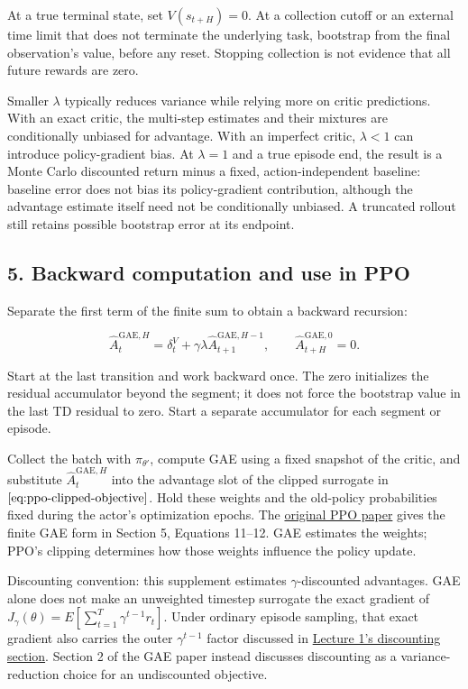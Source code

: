 \documentclass[11pt, a4paper]{article}
\begin{document}
At a true terminal state, set $V(s_{t+H})=0$. At a collection cutoff or an external time limit that does not terminate the underlying task, bootstrap from the final observation's value, before any reset. Stopping collection is not evidence that all future rewards are zero.

Smaller $\lambda$ typically reduces variance while relying more on critic predictions. With an exact critic, the multi-step estimates and their mixtures are conditionally unbiased for advantage. With an imperfect critic, $\lambda<1$ can introduce policy-gradient bias. At $\lambda=1$ and a true episode end, the result is a Monte Carlo discounted return minus a fixed, action-independent baseline: baseline error does not bias its policy-gradient contribution, although the advantage estimate itself need not be conditionally unbiased. A truncated rollout still retains possible bootstrap error at its endpoint.

\subsection*{5. Backward computation and use in PPO}

Separate the first term of the finite sum to obtain a backward recursion:

\begin{equation}\label{eq:ppo-gae-backward-recursion}
    \hat A_t^{\mathrm{GAE},H}
    =\delta_t^V+\gamma\lambda\hat A_{t+1}^{\mathrm{GAE},H-1},
    \qquad \hat A_{t+H}^{\mathrm{GAE},0}=0.
\end{equation}

Start at the last transition and work backward once. The zero initializes the residual accumulator beyond the segment; it does not force the bootstrap value in the last TD residual to zero. Start a separate accumulator for each segment or episode.

Collect the batch with $\pi_{\theta'}$, compute GAE using a fixed snapshot of the critic, and substitute $\hat A_t^{\mathrm{GAE},H}$ into the advantage slot of the clipped surrogate in $\eqref{eq:ppo-clipped-objective}$. Hold these weights and the old-policy probabilities fixed during the actor's optimization epochs. The \href{https://arxiv.org/abs/1707.06347}{original PPO paper} gives the finite GAE form in Section 5, Equations 11--12. GAE estimates the weights; PPO's clipping determines how those weights influence the policy update.

Discounting convention: this supplement estimates $\gamma$-discounted advantages. GAE alone does not make an unweighted timestep surrogate the exact gradient of $J_\gamma(\theta)=E[\sum_{t=1}^{T}\gamma^{t-1}r_t]$. Under ordinary episode sampling, that exact gradient also carries the outer $\gamma^{t-1}$ factor discussed in \href{https://jiadinggai.github.io/blog/2026/drl-lecture-1-policy-gradient/\#tip-2-assigning-suitable-credit-reward-to-go-and-discounting}{Lecture 1's discounting section}. Section 2 of the GAE paper instead discusses discounting as a variance-reduction choice for an undiscounted objective.
\end{document}
